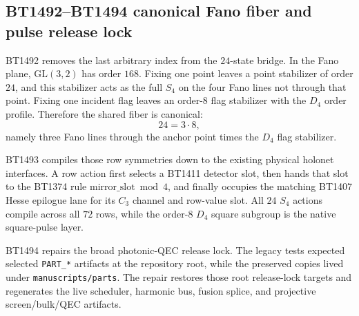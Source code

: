 \subsection{BT1492--BT1494 canonical Fano fiber and pulse release lock}
\label{sec:bt1492-bt1494-canonical-fano-pulse-lock}

BT1492 removes the last arbitrary index from the \(24\)-state bridge.  In the
Fano plane, \(\mathrm{GL}(3,2)\) has order \(168\).  Fixing one point leaves a
point stabilizer of order \(24\), and this stabilizer acts as the full \(S_4\)
on the four Fano lines not through that point.  Fixing one incident flag leaves
an order-\(8\) flag stabilizer with the \(D_4\) order profile.  Therefore the
shared fiber is canonical:
\[
24 = 3\cdot 8,
\]
namely three Fano lines through the anchor point times the \(D_4\) flag
stabilizer.

BT1493 compiles those row symmetries down to the existing physical holonet
interfaces.  A row action first selects a BT1411 detector slot, then hands that
slot to the BT1374 rule \(\mathrm{mirror\_slot}\bmod 4\), and finally occupies
the matching BT1407 Hesse epilogue lane for its \(C_3\) channel and row-value
slot.  All \(24\) \(S_4\) actions compile across all \(72\) rows, while the
order-\(8\) \(D_4\) square subgroup is the native square-pulse layer.

BT1494 repairs the broad photonic-QEC release lock.  The legacy tests expected
selected \texttt{PART\_*} artifacts at the repository root, while the preserved
copies lived under \texttt{manuscripts/parts}.  The repair restores those root
release-lock targets and regenerates the live scheduler, harmonic bus, fusion
splice, and projective screen/bulk/QEC artifacts.
